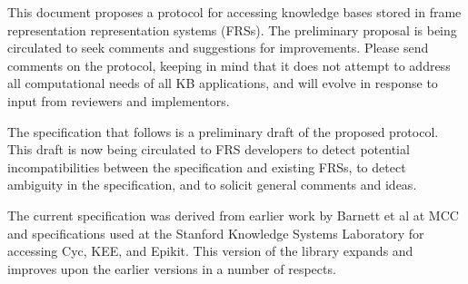 
This document proposes a protocol for accessing knowledge bases stored
in frame representation representation systems (FRSs).  The
preliminary proposal is being circulated to seek comments and
suggestions for improvements.  Please send comments on the protocol,
keeping in mind that it does not attempt to address all computational
needs of all KB applications, and will evolve in response to input
from reviewers and implementors.

The specification that follows is a preliminary draft of the proposed
protocol.  This draft is now being circulated to FRS developers to
detect potential incompatibilities between the specification and
existing FRSs, to detect ambiguity in the specification, and to solicit general
comments and ideas.

The current specification was derived from earlier work by Barnett et al at
MCC \cite{Barnett91} and specifications used at the Stanford Knowledge Systems
Laboratory for accessing Cyc, KEE, and Epikit.  This version of the library
expands and improves upon the earlier versions in a number of respects.

\newpage
